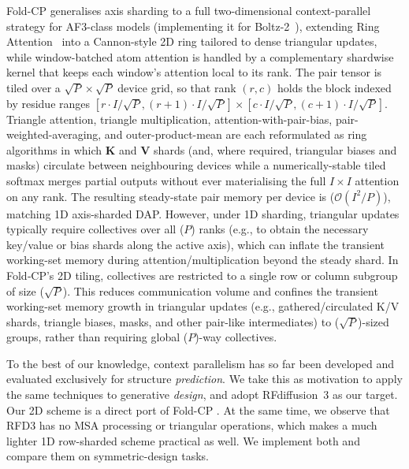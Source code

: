 \documentclass{article}
\theoremstyle{plain}
\theoremstyle{definition}
\theoremstyle{remark}
\begin{document}
Fold-CP \citep{lin_fold-cp_2026} generalises axis sharding to a full two-dimensional context-parallel strategy for AF3-class models (implementing it for Boltz-2~\citep{passaro_boltz-2_2025}), extending Ring Attention~\citep{liu_ring_2023} into a Cannon-style 2D ring tailored to dense triangular updates, while window-batched atom attention is handled by a complementary shardwise kernel that keeps each window's attention local to its rank. The pair tensor is tiled over a $\sqrt{P}\times\sqrt{P}$ device grid, so that rank $(r,c)$ holds the block indexed by residue ranges $[r\cdot I/\sqrt{P}, (r{+}1)\cdot I/\sqrt{P}]\times [c\cdot I/\sqrt{P}, (c{+}1)\cdot I/\sqrt{P}]$. Triangle attention, triangle multiplication, attention-with-pair-bias, pair-weighted-averaging, and outer-product-mean are each reformulated as ring algorithms in which $\mathbf{K}$ and $\mathbf{V}$ shards (and, where required, triangular biases and masks) circulate between neighbouring devices while a numerically-stable tiled softmax merges partial outputs without ever materialising the full $I\times I$ attention on any rank. The resulting steady-state pair memory per device is ($\mathcal{O}(I^2/P)$), matching 1D axis-sharded DAP. However, under 1D sharding, triangular updates typically require collectives over all ($P$) ranks (e.g., to obtain the necessary key/value or bias shards along the active axis), which can inflate the transient working-set memory during attention/multiplication beyond the steady shard. In Fold‑CP’s 2D tiling, collectives are restricted to a single row or column subgroup of size ($\sqrt{P}$). This reduces communication volume and confines the transient working-set memory growth in triangular updates (e.g., gathered/circulated K/V shards, triangle biases, masks, and other pair-like intermediates) to ($\sqrt{P}$)-sized groups, rather than requiring global ($P$)-way collectives.

To the best of our knowledge, context parallelism has so far been developed and evaluated exclusively for structure \emph{prediction}. We take this as motivation to apply the same techniques to generative \emph{design}, and adopt RFdiffusion~3 \citep{butcher_novo_2025} as our target. Our 2D scheme is a direct port of Fold-CP \citep{lin_fold-cp_2026}. At the same time, we observe that RFD3 has no MSA processing or triangular operations, which makes a much lighter 1D row-sharded scheme practical as well. We implement both and compare them on symmetric-design tasks.
\end{document}
